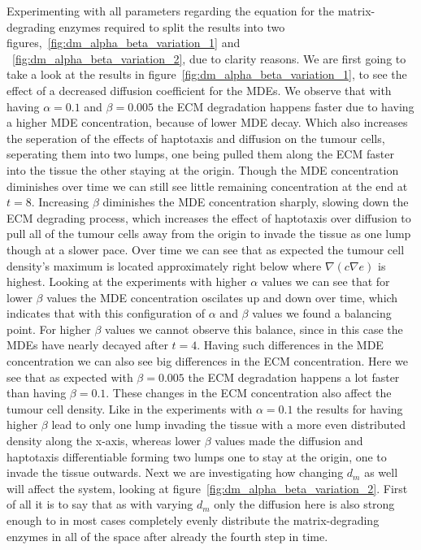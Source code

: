 Experimenting with all parameters regarding the equation for the matrix-degrading enzymes required to split the results into two figures,~\ref{fig:dm_alpha_beta_variation_1} and ~\ref{fig:dm_alpha_beta_variation_2}, due to clarity reasons. 
We are first going to take a look at the results in figure~\ref{fig:dm_alpha_beta_variation_1}, to see the effect of a decreased diffusion coefficient for the MDEs. We observe that with having $\alpha =0.1$ and $\beta=0.005$ the ECM degradation happens faster due to having a higher MDE concentration, because of lower MDE decay. Which also increases the seperation of the effects of haptotaxis and diffusion on the tumour cells, seperating them into two lumps, one being pulled them along the ECM faster into the tissue the other staying at the origin. Though the MDE concentration diminishes over time we can still see little remaining concentration at the end at $t=8$. Increasing $\beta$ diminishes the MDE concentration sharply, slowing down the ECM degrading process, which increases the effect of haptotaxis over diffusion to pull all of the tumour cells away from the origin to invade the tissue as one lump though at a slower pace. Over time we can see that as expected the tumour cell density's maximum is located approximately right below where $\nabla (c \nabla e)$ is highest. \newline
Looking at the experiments with higher $\alpha$ values we can see that for lower $\beta$ values the MDE concentration oscilates up and down over time, which indicates that with this configuration of $\alpha$ and $\beta$ values we found a balancing point. For higher $\beta$ values we cannot observe this balance, since in this case the MDEs have nearly decayed after $t=4$. Having such differences in the MDE concentration we can also see big differences in the ECM concentration. Here we see that as expected with $\beta=0.005$ the ECM degradation happens a lot faster than having $\beta=0.1$. These changes in the ECM concentration also affect the tumour cell density. Like in the experiments with $\alpha=0.1$ the results for having higher $\beta$ lead to only one lump invading the tissue with a more even distributed density along the x-axis, whereas lower $\beta$ values made the diffusion and haptotaxis differentiable forming two lumps one to stay at the origin, one to invade the tissue outwards.\newline 
Next we are investigating how changing $d_m$ as well will affect the system, looking at figure~\ref{fig:dm_alpha_beta_variation_2}. First of all it is to say that as with varying $d_m$ only the diffusion here is also strong enough to in most cases completely evenly distribute the matrix-degrading enzymes in all of the space after already the fourth step in time. \newline 
